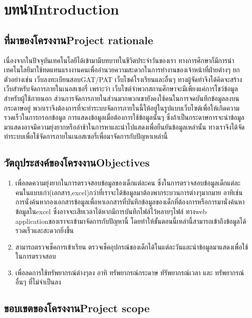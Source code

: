 \chapter{\ifcpe บทนำ\else Introduction\fi}

\section{\ifcpe ที่มาของโครงงาน\else Project rationale\fi}

เนื่องจากในปัจจุบันเทคโนโลยีได้เข้ามามีบทบาทในชีวิตประจำวันของเรา ทางการศึกษาก็มีการนำเทคโนโลยีมาใช้ทดแทนแรงงานคนเพื่ออำนวยความสะดวกในการทำงานของเจ้าหน้าที่ฝ่ายต่างๆ  ยกตัวอย่างเช่น เว็บลงทะเบียนสอบGAT/PAT เว็บไซค์โรงเรียนและอื่นๆ ทางผู้จัดทำจึงได้คิดจะสร้างเว็บสำหรับจัดการภายในเนอสเซอรี่ เพราะว่า เว็บไซต์จำพวกสถานศึกษาจะมีเพียงแค่การโชว์ข้อมูลสำหรับผู้ใช้ภายนอก ส่วนการจัดการภายในส่วนมากพวกเขายังคงใช้คนในการจดบันทึกข้อมูลลงบนกระดาษอยู่ พวกเราจึงต้องการที่จะทำระบบจัดการภายในนี้ให้อยู่ในรูปแบบเว็บไซต์เพื่อให้เกิดความรวดเร็วในการกรอกข้อมูล การแสดงข้อมูลเมื่อต้องการใช้ข้อมูลนั้นๆ ซึ่งถ้าเป็นกระดาษการจะนำข้อมูลมาแสดงอาจมีความยุ่งยากหรือล่าช้าในการหาและนำไปแสดงเพื่อยืนยันข้อมูลเหล่านั้น ทางเราจึงได้จัดทำระบบเพื่อใช้จัดการภายในเนอสเซอรี่เพื่อมาจัดการกับปัญหาเหล่านี้


\section{\ifcpe วัตถุประสงค์ของโครงงาน\else Objectives\fi}
\begin{enumerate}
    \item เพื่อลดความยุ่งยากในการตรวจสอบข้อมูลของเด็กแต่ละคน ซึ่งในการตรวจสอบข้อมูลเด็กแต่ละคนในแบบเก่า(เอกสาร,excel)กว่าที่เราจะได้ข้อมูลมาต้องพากระบวนการต่างๆมากมาย อาทิเช่น การนั่งค้นหากองเอกสารข้อมูลเพื่อหาเอกสารที่บันทึกข้อมูลของเด็กที่ต้องการหรือการมานั่งค้นหาข้อมูลในexcel 
    ซึ่งอาจจะเสียเวลาได้หากมีการบันทึกไฟล์ไว้หลายๆไฟล์
    ทางweb applicationของเราจะเข้ามาจัดการกับปัญหานี้ โดยทำให้ขั้นตอนนี้เหล่านี้สามารถเข้าถึงข้อมูลได้รวดเร็วและสะดวกยิ่งขึ้น
    \item สามารถตรวจเช็คการเข้าเรียน ตรวจเช็คอุปกรณ์ของเด็กได้ในแต่ละวันและนำข้อมูลมาแสดงเพื่อใช้ในการตรวจสอบ
    \item เพื่อลดการใช้ทรัพยากรณ์ต่างๆลง อาทิ ทรัพยากรณ์กระดาษ ทัรัพยากรณ์เวลา และ ทรัพยากรณ์อื่นๆ ที่ไม่จำเป็นลง
\end{enumerate}

\section{\ifcpe ขอบเขตของโครงงาน\else Project scope\fi}

